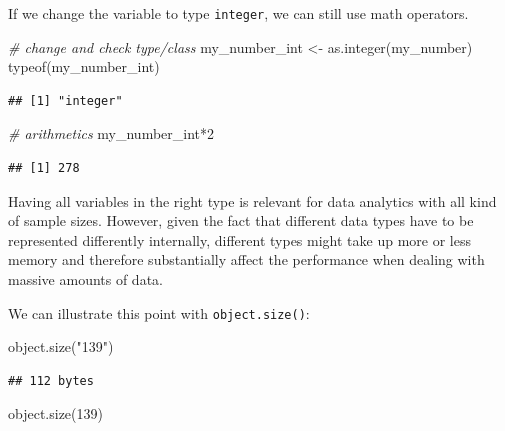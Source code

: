 \documentclass[
  12pt,
]{style/krantz}
\newenvironment{Shaded}{\begin{snugshade}}{\end{snugshade}}
\newcommand{\CommentTok}[1]{\textcolor[rgb]{0.56,0.35,0.01}{\textit{#1}}}
\newcommand{\DecValTok}[1]{\textcolor[rgb]{0.00,0.00,0.81}{#1}}
\newcommand{\FunctionTok}[1]{\textcolor[rgb]{0.00,0.00,0.00}{#1}}
\newcommand{\NormalTok}[1]{#1}
\newcommand{\OtherTok}[1]{\textcolor[rgb]{0.56,0.35,0.01}{#1}}
\newcommand{\SpecialCharTok}[1]{\textcolor[rgb]{0.00,0.00,0.00}{#1}}
\newcommand{\StringTok}[1]{\textcolor[rgb]{0.31,0.60,0.02}{#1}}
\begin{document}
If we change the variable to type \texttt{integer}, we can still use math operators.

\begin{Shaded}
\begin{Highlighting}[]
\CommentTok{\# change and check type/class}
\NormalTok{my\_number\_int }\OtherTok{\textless{}{-}} \FunctionTok{as.integer}\NormalTok{(my\_number)}
\FunctionTok{typeof}\NormalTok{(my\_number\_int)}
\end{Highlighting}
\end{Shaded}

\begin{verbatim}
## [1] "integer"
\end{verbatim}

\begin{Shaded}
\begin{Highlighting}[]
\CommentTok{\# arithmetics}
\NormalTok{my\_number\_int}\SpecialCharTok{*}\DecValTok{2}
\end{Highlighting}
\end{Shaded}

\begin{verbatim}
## [1] 278
\end{verbatim}

Having all variables in the right type is relevant for data analytics with all kind of sample sizes. However, given the fact that different data types have to be represented differently internally, different types might take up more or less memory and therefore substantially affect the performance when dealing with massive amounts of data.

We can illustrate this point with \texttt{object.size()}:

\begin{Shaded}
\begin{Highlighting}[]
\FunctionTok{object.size}\NormalTok{(}\StringTok{"139"}\NormalTok{)}
\end{Highlighting}
\end{Shaded}

\begin{verbatim}
## 112 bytes
\end{verbatim}

\begin{Shaded}
\begin{Highlighting}[]
\FunctionTok{object.size}\NormalTok{(}\DecValTok{139}\NormalTok{)}
\end{Highlighting}
\end{Shaded}
\end{document}
